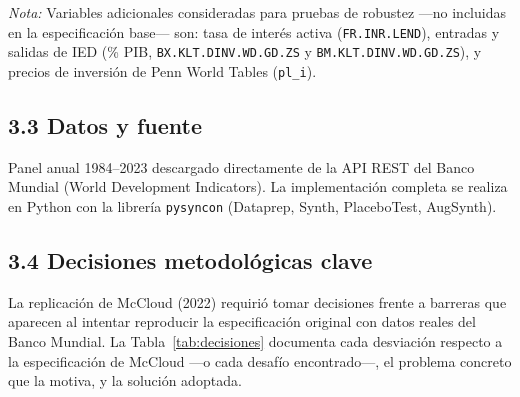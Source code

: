 \documentclass[11pt,a4paper]{article}
\begin{document}
\noindent\textit{Nota:} Variables adicionales consideradas para pruebas de robustez —no incluidas en la especificación base— son: tasa de interés activa (\texttt{FR.INR.LEND}), entradas y salidas de IED (\% PIB, \texttt{BX.KLT.DINV.WD.GD.ZS} y \texttt{BM.KLT.DINV.WD.GD.ZS}), y precios de inversión de Penn World Tables (\texttt{pl\_i}).

\subsection*{3.3 Datos y fuente}

Panel anual 1984–2023 descargado directamente de la API REST del Banco Mundial (World Development Indicators). La implementación completa se realiza en Python con la librería \texttt{pysyncon} (Dataprep, Synth, PlaceboTest, AugSynth).

\subsection*{3.4 Decisiones metodológicas clave}

La replicación de McCloud (2022) requirió tomar decisiones frente a barreras que aparecen al intentar reproducir la especificación original con datos reales del Banco Mundial. La Tabla~\ref{tab:decisiones} documenta cada desviación respecto a la especificación de McCloud —o cada desafío encontrado—, el problema concreto que la motiva, y la solución adoptada.
\end{document}
